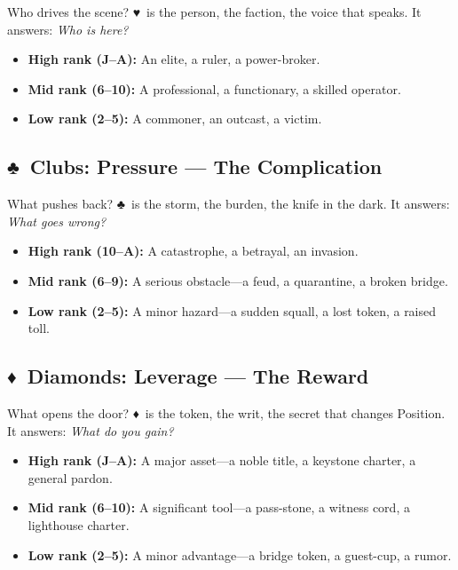 \documentclass[12pt,oneside]{book}
\renewcommand{\heartsuit}{♥}
\renewcommand{\clubsuit}{♣}
\renewcommand{\diamondsuit}{♦}
\begin{document}
Who drives the scene? \heartsuit\ is the person, the faction, the voice that speaks. It answers: \textit{Who is here?}

\begin{itemize}
    \item \textbf{High rank (J--A):} An elite, a ruler, a power-broker.
    \item \textbf{Mid rank (6--10):} A professional, a functionary, a skilled operator.
    \item \textbf{Low rank (2--5):} A commoner, an outcast, a victim.
\end{itemize}

\subsection*{\clubsuit\ Clubs: Pressure --- The Complication}

What pushes back? \clubsuit\ is the storm, the burden, the knife in the dark. It answers: \textit{What goes wrong?}

\begin{itemize}
    \item \textbf{High rank (10--A):} A catastrophe, a betrayal, an invasion.
    \item \textbf{Mid rank (6--9):} A serious obstacle---a feud, a quarantine, a broken bridge.
    \item \textbf{Low rank (2--5):} A minor hazard---a sudden squall, a lost token, a raised toll.
\end{itemize}

\subsection*{\diamondsuit\ Diamonds: Leverage --- The Reward}

What opens the door? \diamondsuit\ is the token, the writ, the secret that changes Position. It answers: \textit{What do you gain?}

\begin{itemize}
    \item \textbf{High rank (J--A):} A major asset---a noble title, a keystone charter, a general pardon.
    \item \textbf{Mid rank (6--10):} A significant tool---a pass-stone, a witness cord, a lighthouse charter.
    \item \textbf{Low rank (2--5):} A minor advantage---a bridge token, a guest-cup, a rumor.
\end{itemize}
\end{document}
